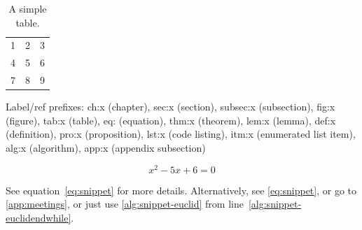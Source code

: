 {    \begin{table}
        \begin{center}
            \begin{tabular}{|lcr|}
                \hline
                1 & 2 & 3\\
                4 & 5 & 6\\
                7 & 8 & 9\\
                \hline
            \end{tabular}
            \caption[]{A simple table.}
        \end{center}
    \end{table}

    Label/ref prefixes:
    ch:x (chapter), sec:x (section), subsec:x (subsection),
    fig:x (figure), tab:x (table), eq: (equation),
    thm:x (theorem), lem:x (lemma), def:x (definition), pro:x (proposition),
    lst:x (code listing), itm:x (enumerated list item),
    alg:x (algorithm), app:x (appendix subsection)
    
    \begin{equation}
        \label{eq:snippet}
        x^2 - 5 x + 6 = 0
    \end{equation}
    
    See equation~\ref{eq:snippet} for more details.
    Alternatively, see \eqref{eq:snippet}, or go to \autoref{app:meetings},
    or just use \autoref{alg:snippet-euclid} from line~\ref{alg:snippet-euclidendwhile}.

    
}
